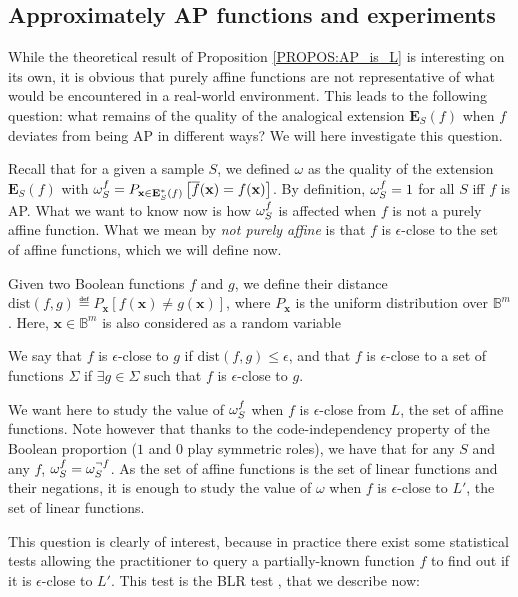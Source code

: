 \subsection{Approximately AP functions and experiments}
\label{SEC:approximate_ap_functions}

While the theoretical result of Proposition \ref{PROPOS:AP_is_L} is interesting
on its own, it is obvious that purely affine functions are not representative
of what would be encountered in a real-world environment.  This leads to the
following question: what remains of the quality of the analogical extension
$\mathbf{E}_S(f)$ when $f$ deviates from being AP in different ways? We will
here investigate this question.

Recall that for a given a sample $S$, we defined $\omega$ as the quality of the
extension $\mathbf{E}_S(f)$ with $\omega_{S}^{f} = P_{\mathbf{x}\in
\mathbf{E}^*_S(f)}\left[\overline{f}(\mathbf{x}) = f(\mathbf{x})\right]$.  By
definition, $\omega_{S}^{f}=1$ for all $S$ iff $f$ is AP. What we want to know now is
how $\omega_{S}^{f}$ is affected when $f$ is not a purely affine function. What we
mean by \textit{not purely affine} is that $f$ is $\epsilon$-close to the set
of affine functions, which we will define now.


Given two Boolean functions $f$ and $g$, we define their distance
$\text{dist}(f, g) \eqdef P_\mathbf{x}\left[f(\mathbf{x}) \neq
g(\mathbf{x})\right]$, where $P_\mathbf{x}$ is the uniform distribution over
$\mathbb{B}^m$. Here, $\mathbf{x} \in \mathbb{B}^m$ is also considered as a
random variable

\begin{definition}
We say that $f$ is $\epsilon$-close to $g$ if $\text{dist}(f, g) \leq
  \epsilon$, and that $f$ is $\epsilon$-close to a set of functions $\Sigma$ if
  $\exists g \in \Sigma$ such that $f$ is $\epsilon$-close to $g$.
\end{definition}

We want here to study the value of $\omega_{S}^{f}$ when $f$ is $\epsilon$-close from
$L$, the set of affine functions. Note however that thanks to the
code-independency property of the Boolean proportion ($1$ and $0$ play
symmetric roles), we have that for any $S$ and any $f$, $\omega_{S}^{f} =
\omega_S^{\neg f}$. As the set of affine functions is the set of linear
functions and their negations, it is enough to study the value of $\omega$ when
$f$ is $\epsilon$-close to $L'$, the set of linear functions.

This question is clearly of interest, because in practice there exist some
statistical tests allowing the practitioner to query a partially-known function
$f$ to find out if it is $\epsilon$-close to $L'$. This test is the BLR test
\cite{BluLubRub93}, that we describe now:

